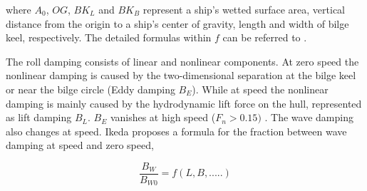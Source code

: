 

where $A_{0}$, $OG$, $BK_{L}$ and $BK_{B}$ represent a ship's wetted surface area, vertical distance from the origin to a ship's center of gravity, length and width of bilge keel, respectively. The detailed formulas within $f$ can be referred to \parencite{himeno_prediction_1981}.




The roll damping consists of linear and nonlinear components. At zero speed the nonlinear damping is caused by the two-dimensional separation at the bilge keel or near the bilge circle (Eddy damping $B_E$). While at speed the nonlinear damping is mainly caused by the hydrodynamic lift force on the hull, represented as lift damping $B_L$. $B_E$ vanishes at high speed ($F_n>0.15)$ \parencite{ikeda_components_1978}.
The wave damping also changes at speed. Ikeda \parencite{ikeda_components_1978} proposes a formula for the fraction between wave damping at speed and zero speed,

\begin{equation} \label{eq:wave_speed_correction}
\frac{B_W}{B_{W0}} = f(L, B, .....) 
\end{equation}








